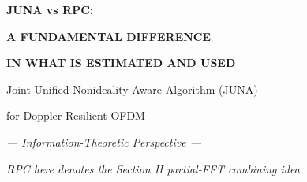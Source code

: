 \documentclass[aspectratio=169,10pt]{beamer}
\begin{document}
\begin{frame}[plain]
  \vspace{1.3cm}
  \begin{center}
    {\bfseries\Huge JUNA vs RPC:\par}
    \vspace{0.45em}
    {\bfseries\LARGE A FUNDAMENTAL DIFFERENCE\par}
    \vspace{0.30em}
    {\bfseries\LARGE IN WHAT IS ESTIMATED AND USED\par}

    \vspace{0.9cm}

    \vspace{0.7cm}
    {\Large Joint Unified Nonideality-Aware Algorithm (JUNA)\par}
    \vspace{0.15em}
    {\Large for Doppler-Resilient OFDM\par}

    \vspace{0.8cm}
    {\itshape\large\color{inkgray}--- Information-Theoretic Perspective ---\par}
    \vspace{0.25em}
    {\itshape\normalsize\color{inkgray}
      RPC here denotes the Section II partial-FFT combining idea\par}
  \end{center}
\end{frame}
\end{document}
